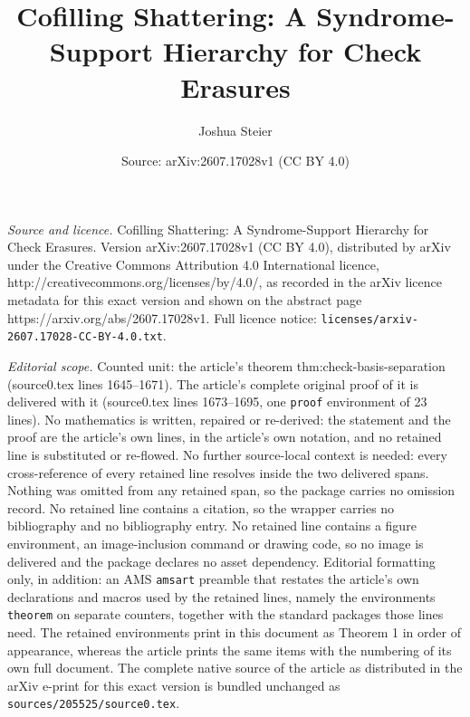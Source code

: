 \documentclass[10pt,a4paper]{amsart}
\title{Cofilling Shattering: A Syndrome-Support Hierarchy for Check Erasures}
\author{Joshua Steier}
\date{Source: arXiv:2607.17028v1 (CC BY 4.0)}
\begin{document}
\maketitle

\noindent\emph{Source and licence.} Cofilling Shattering: A Syndrome-Support Hierarchy for Check Erasures. Version arXiv:2607.17028v1 (CC BY 4.0), distributed by arXiv under the Creative Commons Attribution 4.0 International licence, http://creativecommons.org/licenses/by/4.0/, as recorded in the arXiv licence metadata for this exact version and shown on the abstract page https://arxiv.org/abs/2607.17028v1. Full licence notice: \texttt{licenses/arxiv-2607.17028-CC-BY-4.0.txt}.\par\smallskip

\noindent\textit{Editorial scope.} Counted unit: the article's theorem thm:check-basis-separation (source0.tex lines 1645--1671). The article's complete original proof of it is delivered with it (source0.tex lines 1673--1695, one \texttt{proof} environment of 23 lines). No mathematics is written, repaired or re-derived: the statement and the proof are the article's own lines, in the article's own notation, and no retained line is substituted or re-flowed.  No further source-local context is needed: every cross-reference of every retained line resolves inside the two delivered spans.  Nothing was omitted from any retained span, so the package carries no omission record.  No retained line contains a citation, so the wrapper carries no bibliography and no bibliography entry.  No retained line contains a figure environment, an image-inclusion command or drawing code, so no image is delivered and the package declares no asset dependency.  Editorial formatting only, in addition: an AMS \texttt{amsart} preamble that restates the article's own declarations and macros used by the retained lines, namely the environments \texttt{theorem} on separate counters, together with the standard packages those lines need.  The retained environments print in this document as Theorem 1 in order of appearance, whereas the article prints the same items with the numbering of its own full document.  The complete native source of the article as distributed in the arXiv e-print for this exact version is bundled unchanged as \texttt{sources/205525/source0.tex}.
\end{document}
